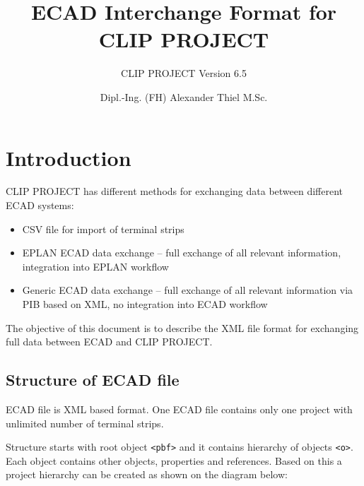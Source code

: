 \documentclass[%
	a4paper,
	oneside,
	listof=numbered,
	parskip=half,
	headsepline=true,
	footsepline=true,
	]{scrbook}
\begin{document}
\title{ECAD Interchange Format for CLIP PROJECT}
\subtitle{CLIP PROJECT Version 6.5}

\subject{ALX-Development}
\author{Dipl.-Ing. (FH) Alexander Thiel M.Sc.}


\maketitle
\tableofcontents

\chapter{Introduction}

CLIP PROJECT has different methods for exchanging data between different ECAD systems:

\begin{itemize}
	\item CSV file for import of terminal strips 
	\item EPLAN ECAD data exchange – full exchange of all relevant information, integration into EPLAN workflow 
	\item Generic ECAD data exchange – full exchange of all relevant information via PIB based on XML, no integration into ECAD workflow 
\end{itemize}

The objective of this document is to describe the XML file format for exchanging full data between ECAD and CLIP PROJECT. 

\section{Structure of ECAD file}

ECAD file is XML based format. One ECAD file contains only one project with unlimited number of terminal strips.

Structure starts with root object \verb|<pbf>| and it contains hierarchy of objects \verb|<o>|. Each object contains other objects, properties and references. Based on this a project hierarchy can be created as shown on the diagram below:
\end{document}
